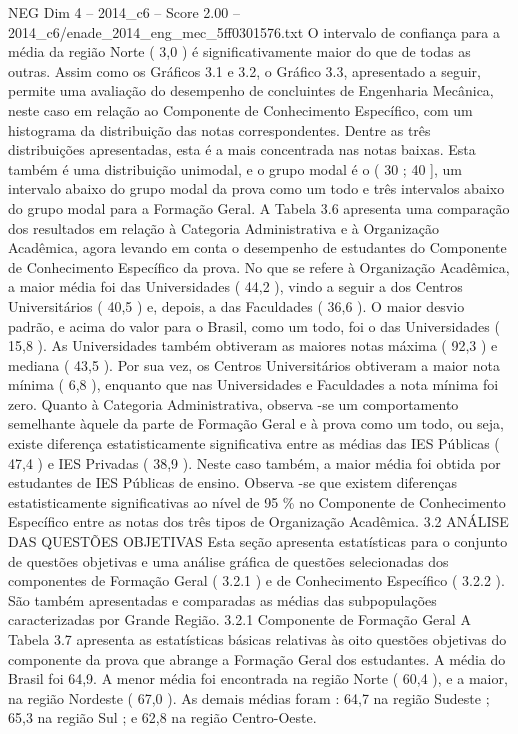 \begin{textsample}{NEG Dim 4 – 2014\_c6 – Score 2.00 – 2014\_c6/enade\_2014\_eng\_mec\_5ff0301576.txt}
O intervalo de confiança para a média da região Norte ( 3,0 ) é significativamente maior do que de todas as outras.
Assim como os Gráficos 3.1 e 3.2, o Gráfico 3.3, apresentado a seguir, permite uma avaliação do desempenho de concluintes de Engenharia Mecânica, neste caso em relação ao Componente de Conhecimento Específico, com um histograma da distribuição das notas correspondentes.
Dentre as três distribuições apresentadas, esta é a mais concentrada nas notas baixas.
Esta também é uma distribuição unimodal, e o grupo modal é o ( 30 ; 40 ], um intervalo abaixo do grupo modal da prova como um todo e três intervalos abaixo do grupo modal para a Formação Geral.
A Tabela 3.6 apresenta uma comparação dos resultados em relação à Categoria Administrativa e à Organização Acadêmica, agora levando em conta o desempenho de estudantes do Componente de Conhecimento Específico da prova.
No que se refere à Organização Acadêmica, a maior média foi das Universidades ( 44,2 ), vindo a seguir a dos Centros Universitários ( 40,5 ) e, depois, a das Faculdades ( 36,6 ).
O maior desvio padrão, e acima do valor para o Brasil, como um todo, foi o das Universidades ( 15,8 ).
As Universidades também obtiveram as maiores notas máxima ( 92,3 ) e mediana ( 43,5 ).
Por sua vez, os Centros Universitários obtiveram a maior nota mínima ( 6,8 ), enquanto que nas Universidades e Faculdades a nota mínima foi zero.
Quanto à Categoria Administrativa, observa -se um comportamento semelhante àquele da parte de Formação Geral e à prova como um todo, ou seja, existe diferença estatisticamente significativa entre as médias das IES Públicas ( 47,4 ) e IES Privadas ( 38,9 ).
Neste caso também, a maior média foi obtida por estudantes de IES Públicas de ensino.
Observa -se que existem diferenças estatisticamente significativas ao nível de 95 \% no Componente de Conhecimento Específico entre as notas dos três tipos de Organização Acadêmica. 3.2 ANÁLISE DAS QUESTÕES OBJETIVAS Esta seção apresenta estatísticas para o conjunto de questões objetivas e uma análise gráfica de questões selecionadas dos componentes de Formação Geral ( 3.2.1 ) e de Conhecimento Específico ( 3.2.2 ).
São também apresentadas e comparadas as médias das subpopulações caracterizadas por Grande Região. 3.2.1 Componente de Formação Geral A Tabela 3.7 apresenta as estatísticas básicas relativas às oito questões objetivas do componente da prova que abrange a Formação Geral dos estudantes.
A média do Brasil foi 64,9.
A menor média foi encontrada na região Norte ( 60,4 ), e a maior, na região Nordeste ( 67,0 ).
As demais médias foram : 64,7 na região Sudeste ; 65,3 na região Sul ; e 62,8 na região Centro-Oeste.

\end{textsample}
